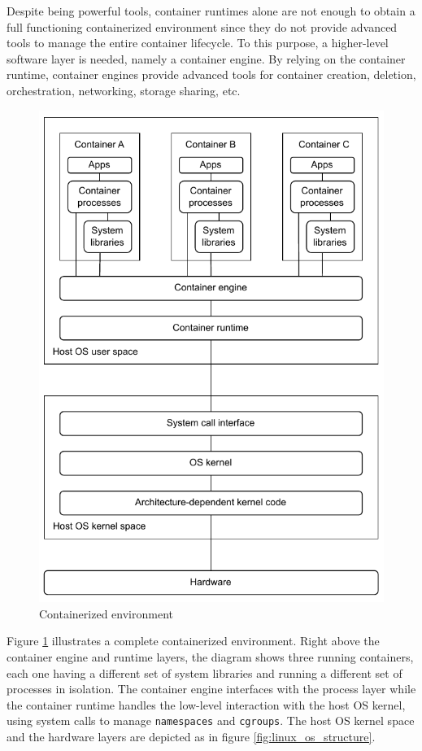 Despite being powerful tools, container runtimes alone are not enough to obtain a full functioning containerized environment since they do not provide advanced tools to manage the entire container lifecycle.  
To this purpose, a higher-level software layer is needed, namely a container engine. 
By relying on the container runtime, container engines provide advanced tools for container creation, deletion, orchestration, networking, storage sharing, etc. 

\begin{figure}[htbp]
    \centering
    \includegraphics{assets/containerization.pdf}
    \caption{Containerized environment}
    \label{fig:containers}
\end{figure}

Figure \ref{fig:containers} illustrates a complete containerized environment.
Right above the container engine and runtime layers, the diagram shows three running containers, each one having a different set of system libraries and running a different set of processes in isolation. 
The container engine interfaces with the process layer while the container runtime handles the low-level interaction with the host OS kernel, using system calls to manage \texttt{namespaces} and \texttt{cgroups}. 
The host OS kernel space and the hardware layers are depicted as in figure \ref{fig:linux_os_structure}. 

